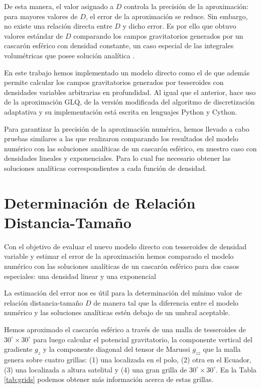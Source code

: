 \documentclass[a4paper,10pt]{article}
\begin{document}
De esta manera, el valor asignado a $D$ controla la precisión de la aproximación: para mayores valores de $D$, el error de la aproximación se reduce.
Sin embargo, no existe una relación directa entre $D$ y dicho error.
Es por ello que \citet{Uieda2016} obtuvo valores estándar de $D$ comparando los campos gravitatorios generados por un cascarón esférico con densidad constante, un caso especial de las integrales volumétricas que posee solución analítica \citep{LaFehr1991, Mikuska2006, Grombein2013}.

En este trabajo hemos implementado un modelo directo como el de \citet{Uieda2016} que además permite calcular los campos gravitatorios generados por tesseroides con densidades variables arbitrarias en profundidad.
Al igual que el anterior, hace uso de la aproximación GLQ, de la versión modificada del algoritmo de discretización adaptativa y su implementación está escrita en lenguajes Python y Cython.

Para garantizar la precisión de la aproximación numérica, hemos llevado a cabo pruebas similares a las que realizaron \citet{Uieda2016} comparando los resultados del modelo numérico con las soluciones analíticas de un cascarón esférico, en nuestro caso con densidades lineales y exponenciales.
Para lo cual fue necesario obtener las soluciones analíticas correspondientes a cada función de densidad.


\section{Determinación de Relación Distancia-Tamaño}

Con el objetivo de evaluar el nuevo modelo directo con tesseroides de densidad variable y estimar el error de la aproximación hemos comparado el modelo numérico con las soluciones analíticas de un cascarón esférico para dos casos especiales: una densidad linear y una exponencial

La estimación del error nos es útil para la determinación del mínimo valor de relación distancia-tamaño $D$ de manera tal que la diferencia entre el modelo numérico y las soluciones analíticas estén debajo de un umbral aceptable.

Hemos aproximado el cascarón esférico a través de una malla de tesseroides de $30^\circ \times 30^\circ$ para luego calcular el potencial gravitatorio, la componente vertical del gradiente $g_z$ y la componente diagonal del tensor de Marussi $g_{zz}$ que la malla genera sobre cuatro grillas: (1) una localizada en el polo, (2) otra en el Ecuador, (3) una localizada a altura satelital y (4) una gran grilla de $30^\circ \times 30^\circ$.
En la Tabla \ref{tab:grids} podemos obtener más información acerca de estas grillas.
\end{document}
